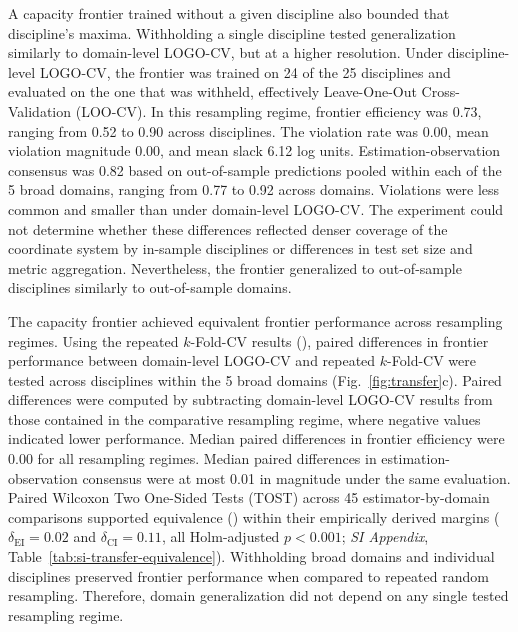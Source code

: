 \documentclass{article}
\begin{document}
A capacity frontier trained without a given discipline also bounded that discipline’s maxima. Withholding a single discipline tested generalization similarly to domain-level LOGO-CV, but at a higher resolution. Under discipline-level LOGO-CV, the frontier was trained on 24 of the 25 disciplines and evaluated on the one that was withheld, effectively Leave-One-Out Cross-Validation (LOO-CV). In this resampling regime, frontier efficiency was 0.73, ranging from 0.52 to 0.90 across disciplines. The violation rate was 0.00, mean violation magnitude 0.00, and mean slack 6.12 log units. Estimation-observation consensus was 0.82 based on out-of-sample predictions pooled within each of the 5 broad domains, ranging from 0.77 to 0.92 across domains. Violations were less common and smaller than under domain-level LOGO-CV. The experiment could not determine whether these differences reflected denser coverage of the coordinate system by in-sample disciplines or differences in test set size and metric aggregation. Nevertheless, the frontier generalized to out-of-sample disciplines similarly to out-of-sample domains.

The capacity frontier achieved equivalent frontier performance across resampling regimes. Using the repeated $k$-Fold-CV results (), paired differences in frontier performance between domain-level LOGO-CV and repeated $k$-Fold-CV were tested across disciplines within the 5 broad domains (Fig.~\ref{fig:transfer}c). Paired differences were computed by subtracting domain-level LOGO-CV results from those contained in the comparative resampling regime, where negative values indicated lower performance. Median paired differences in frontier efficiency were 0.00 for all resampling regimes. Median paired differences in estimation-observation consensus were at most 0.01 in magnitude under the same evaluation. Paired Wilcoxon Two One-Sided Tests (TOST) across 45 estimator-by-domain comparisons supported equivalence () within their empirically derived margins ($\delta_{\mathrm{EI}} = 0.02$ and $\delta_{\mathrm{CI}} = 0.11$, all Holm-adjusted $p < 0.001$; \textit{SI Appendix}, Table~\ref{tab:si-transfer-equivalence}). Withholding broad domains and individual disciplines preserved frontier performance when compared to repeated random resampling. Therefore, domain generalization did not depend on any single tested resampling regime.
\end{document}
